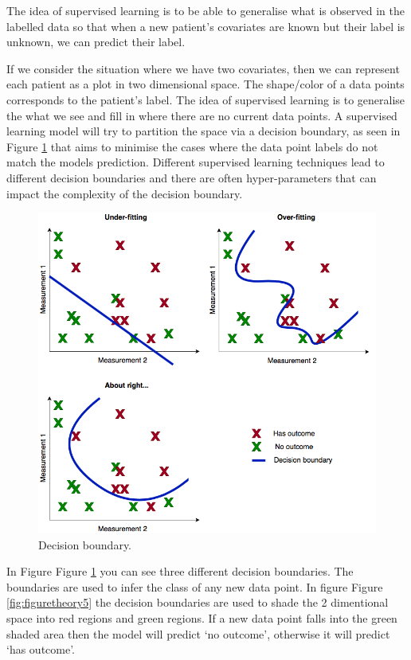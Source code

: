 \documentclass[11pt]{book}
\begin{document}
The idea of supervised learning is to be able to generalise what is
observed in the labelled data so that when a new patient's covariates
are known but their label is unknown, we can predict their label.

If we consider the situation where we have two covariates, then we can
represent each patient as a plot in two dimensional space. The
shape/color of a data points corresponds to the patient's label. The
idea of supervised learning is to generalise the what we see and fill in
where there are no current data points. A supervised learning model will
try to partition the space via a decision boundary, as seen in Figure
\ref{fig:figuretheory4} that aims to minimise the cases where the data
point labels do not match the models prediction. Different supervised
learning techniques lead to different decision boundaries and there are
often hyper-parameters that can impact the complexity of the decision
boundary.

\begin{figure}
\includegraphics[width=1\linewidth]{images/PatientLevelPrediction/theory/learning} \caption{Decision boundary.}\label{fig:figuretheory4}
\end{figure}

In Figure Figure \ref{fig:figuretheory4} you can see three different
decision boundaries. The boundaries are used to infer the class of any
new data point. In figure Figure \ref{fig:figuretheory5} the decision
boundaries are used to shade the 2 dimentional space into red regions
and green regions. If a new data point falls into the green shaded area
then the model will predict `no outcome', otherwise it will predict `has
outcome'.
\end{document}
